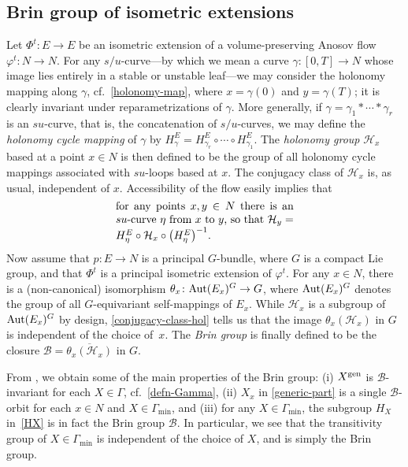 \documentclass[10pt,a4paper]{amsart}
\numberwithin{equation}{section}
\theoremstyle{definition}
\begin{document}
\subsection{Brin group of isometric extensions}

Let $\Phi^t \colon E \rightarrow E$ be an isometric extension of a volume-preserving Anosov flow $\varphi^t \colon N \rightarrow N$. For any $s/u$-curve---by which we mean a curve $\gamma \colon [0,T] \rightarrow N$ whose image lies entirely in a stable or unstable leaf---we may consider the holonomy mapping  along $\gamma$, cf.\ \eqref{holonomy-map}, where $x=\gamma(0)$ and $y=\gamma(T)$; it is clearly invariant under reparametrizations of $\gamma$. More generally, if $\gamma = \gamma_1 \ast \cdots \ast\gamma_r$ is an $su$-curve, that is, the concatenation of $s/u$-curves, we may define the \emph{holonomy cycle mapping} of $\gamma$ by $H^E_\gamma = H^E_{\gamma_r}\circ \cdots \circ H^E_{\gamma_1}$. The \emph{holonomy group} $\mathcal{H}_x$ based at a point $x\in N$ is then defined to be the group of all holonomy cycle mappings associated with $su$-loops based at $x$. The conjugacy class of $\mathcal{H}_x$ is, as usual, independent of $x$. Accessibility of the flow easily implies that \begin{equation}\label{conjugacy-class-hol}
 \parbox{.47\textwidth}{for any points $x,y\in N$ there is an $su$-curve $\eta$ from $x$ to $y$, so that $\mathcal{H}_y = H^E_\eta \circ \mathcal{H}_x\circ \bigl(H^E_\eta\bigr)^{-1}$.}
\end{equation}
Now assume that $p\colon E\to N$ is a principal $G$-bundle, where $G$ is a compact Lie group, and that $\Phi^t$ is a principal isometric extension of $\varphi^t$. For any $x\in N$, there is a (non-canonical) isomorphism $\theta_x\colon {\rm Aut}(E_x)^G \to G$, where ${\rm Aut}(E_x)^G$ denotes the group of all $G$-equivariant self-mappings of $E_x$. While $\mathcal{H}_x$ is a subgroup of ${\rm Aut}(E_x)^G$ by design, \eqref{conjugacy-class-hol} tells us that the image $\theta_x(\mathcal{H}_x)$ in $G$ is independent of the choice of~$x$. The \emph{Brin group} is finally defined to be the closure $\mathcal{B} = \overline{\theta_x(\mathcal{H}_x)}$ in $G$.

From \cite[Corollary 2.2.13 and Propositions~2.2.15 and~2.2.16]{filip2024finiteness}, we obtain some of the main properties of the Brin group: (i) $X^{\rm gen}$ is $\mathcal{B}$-invariant for each $X\in \Gamma$, cf.~\eqref{defn-Gamma}, (ii) $X_x$ in \eqref{generic-part} is a single $\mathcal{B}$-orbit for each $x\in N$ and $X\in \Gamma_{\min}$, and (iii) for any $X\in \Gamma_{\min}$, the subgroup $H_X$ in~\eqref{HX} is in fact the Brin group $\mathcal{B}$. In particular, we see that the transitivity group of $X \in \Gamma_{\min}$ is independent of the choice of $X$, and is simply the Brin group.
\end{document}
